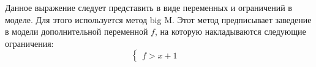 Данное выражение следует представить в виде переменных и ограничений в моделе. Для этого используется метод big M. Этот метод предписывает заведение в модели дополнительной переменной $f$, на которую накладываются следующие ограничения:
\begin{equation}
  \begin{cases}
    f > x + 1 &
  \end{cases}
\end{equation}
